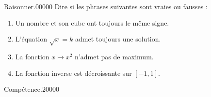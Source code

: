 \begin{pageParcoursd}
\begin{ExoCdN}{Raisonner.}{0}{0}{0}{0}{0}
Dire si les phrases suivantes sont vraies ou fausses :
\begin{enumerate}
\item Un nombre et son cube ont toujours le même signe.
\item L'équation $\sqrt{x}=k$ admet toujours une solution.
\item La fonction $x\mapsto x^2$ n'admet pas de maximum.
\item La fonction inverse est décroissante sur $[-1,1]$.
\end{enumerate}
\end{ExoCdN}

\begin{ExoCdN}{Compétence.}{2}{0}{0}{0}{0}

\end{ExoCdN}

\end{pageParcoursd} %


